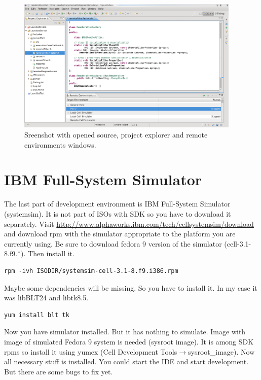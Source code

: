 \begin{figure}
    \centering
    \includegraphics[width=0.95\textwidth]{data/png/eclipse}
    \caption[Screenshot of standard cellide veiw]{Sreenshot with opened source, project explorer and remote environments windows.}
    \label{fg:eclipse}
\end{figure}

\section{IBM Full-System Simulator}

The last part of development environment is IBM Full-System Simulator (systemsim).
It is not part of ISOs with SDK so you have to download it separately.
Visit \url{http://www.alphaworks.ibm.com/tech/cellsystemsim/download} and download rpm with the simulator appropriate to the platform you are currently using.
Be sure to download fedora 9 version of the simulator (cell-3.1-8.f9.*). Then install it.

\begin{verbatim}
rpm -ivh ISODIR/systemsim-cell-3.1-8.f9.i386.rpm
\end{verbatim}

Maybe some dependencies will be missing. So you have to install it. In my case it was libBLT24 and libtk8.5.

\begin{verbatim}
yum install blt tk
\end{verbatim}

Now you have simulator installed. But it has nothing to simulate.
Image with image of simulated Fedora 9 system is needed (sysroot image).
It is among SDK rpms so install it using yumex (Cell Development Tools$\rightarrow$sysroot\_image).
Now all necessary stuff is installed.
You could start the IDE and start development. But there are some bugs to fix yet.

